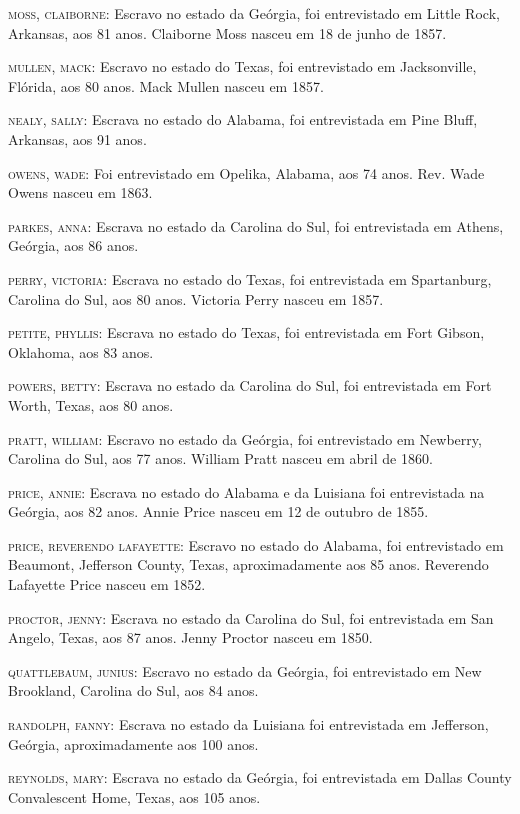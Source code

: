 \begin{Parskip}
\textsc{moss, claiborne:} Escravo no estado da Geórgia, foi entrevistado
em Little Rock, Arkansas, aos 81 anos. Claiborne Moss nasceu em 18 de
junho de 1857.

\textsc{mullen, mack:} Escravo no estado do Texas, foi entrevistado em
Jacksonville, Flórida, aos 80 anos. Mack Mullen nasceu em 1857.

\textsc{nealy, sally:} Escrava no estado do Alabama, foi entrevistada em
Pine Bluff, Arkansas, aos 91 anos.

\textsc{owens, wade:} Foi entrevistado em Opelika, Alabama, aos 74 anos.
Rev. Wade Owens nasceu em 1863.

\textsc{parkes, anna:} Escrava no estado da Carolina do Sul, foi
entrevistada em Athens, Geórgia, aos 86 anos.

\textsc{perry, victoria:} Escrava no estado do Texas, foi entrevistada
em Spartanburg, Carolina do Sul, aos 80 anos. Victoria Perry nasceu em
1857.

\textsc{petite, phyllis:} Escrava no estado do Texas, foi entrevistada
em Fort Gibson, Oklahoma, aos 83 anos.

\textsc{powers, betty:} Escrava no estado da Carolina do Sul, foi
entrevistada em Fort Worth, Texas, aos 80 anos.

\textsc{pratt, william:} Escravo no estado da Geórgia, foi entrevistado
em Newberry, Carolina do Sul, aos 77 anos. William Pratt nasceu em abril
de 1860.

\textsc{price, annie:} Escrava no estado do Alabama e da Luisiana foi
entrevistada na Geórgia, aos 82 anos. Annie Price nasceu em 12 de
outubro de 1855.

\textsc{price, reverendo lafayette:} Escravo no estado do Alabama, foi
entrevistado em Beaumont, Jefferson County, Texas, aproximadamente aos
85 anos. Reverendo Lafayette Price nasceu em 1852.

\textsc{proctor, jenny:} Escrava no estado da Carolina do Sul, foi
entrevistada em San Angelo, Texas, aos 87 anos. Jenny Proctor nasceu em
1850.

\textsc{quattlebaum, junius:} Escravo no estado da Geórgia, foi
entrevistado em New Brookland, Carolina do Sul, aos 84 anos.

\textsc{randolph, fanny:} Escrava no estado da Luisiana foi entrevistada
em Jefferson, Geórgia, aproximadamente aos 100 anos.

\textsc{reynolds, mary:} Escrava no estado da Geórgia, foi entrevistada
em Dallas County Convalescent Home, Texas, aos 105 anos.


\end{Parskip}
